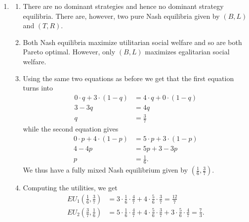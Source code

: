 \documentclass[a4paper]{article}
\begin{document}
\begin{exercise}{3}
\begin{enumerate}[label=(\alph*)]
\begin{enumerate}[label=(\roman*)]
      \end{enumerate}

    \item
      \begin{enumerate}[label=(\roman*)]
        \item There are no dominant strategies and hence no dominant strategy equilibria. There are, however, two pure Nash equilibria given by $ (B, L) $ and $ (T, R) $.

        \item Both Nash equilibria maximize utilitarian social welfare and so are both Pareto optimal. However, only $ (B, L) $ maximizes egalitarian social welfare.

        \item Using the same two equations as before we get that the first equation turns into
          \begin{align*}
            0 \cdot q + 3 \cdot (1 - q) &= 4 \cdot q + 0 \cdot (1 - q) \\
            3 - 3q &= 4q \\
            q &= \frac{3}{7}
          \end{align*}
          while the second equation gives
          \begin{align*}
            0 \cdot p + 4 \cdot(1-p) &= 5\cdot p + 3 \cdot (1 - p) \\
            4 - 4p &= 5p + 3 - 3p \\
            p &= \frac{1}{6}.
          \end{align*}
          We thus have a fully mixed Nash equilibrium given by $ (\frac{1}{6}, \frac{3}{7}) $.

        \item Computing the utilities, we get
          \begin{align*}
            EU_1 \left( \frac{1}{6}, \frac{3}{7} \right) &= 3 \cdot \frac{1}{6}\cdot \frac{4}{7} + 4\cdot \frac{5}{6} \cdot \frac{3}{7} = \frac{12}{7}\\
            EU_2 \left( \frac{3}{7}, \frac{1}{6} \right) &= 5 \cdot \frac{1}{6} \cdot \frac{4}{7} + 4 \cdot \frac{5}{6}\cdot \frac{3}{7} + 3 \cdot \frac{5}{6}\cdot \frac{4}{7} = \frac{7}{3}
          .\end{align*}


\end{enumerate}
\end{enumerate}
\end{exercise}
\end{document}
